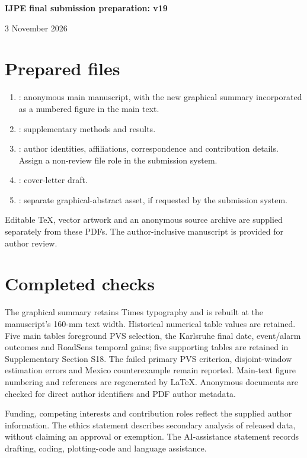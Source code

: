 \documentclass[11pt]{article}
\begin{document}
{\Large\bfseries IJPE final submission preparation: v19}\par
3 November 2026

\section*{Prepared files}
\begin{enumerate}
\item {}: anonymous main manuscript, with the new graphical summary incorporated as a numbered figure in the main text.
\item {}: supplementary methods and results.
\item {}: author identities, affiliations, correspondence and contribution details. Assign a non-review file role in the submission system.
\item {}: cover-letter draft.
\item {}: separate graphical-abstract asset, if requested by the submission system.
\end{enumerate}
Editable TeX, vector artwork and an anonymous source archive are supplied separately from these PDFs. The author-inclusive manuscript is provided for author review.

\section*{Completed checks}
The graphical summary retains Times typography and is rebuilt at the manuscript's 160-mm text width. Historical numerical table values are retained. Five main tables foreground PVS selection, the Karlsruhe final date, event/alarm outcomes and RoadSens temporal gains; five supporting tables are retained in Supplementary Section S18. The failed primary PVS criterion, disjoint-window estimation errors and Mexico counterexample remain reported. Main-text figure numbering and references are regenerated by LaTeX. Anonymous documents are checked for direct author identifiers and PDF author metadata.

Funding, competing interests and contribution roles reflect the supplied author information. The ethics statement describes secondary analysis of released data, without claiming an approval or exemption. The AI-assistance statement records drafting, coding, plotting-code and language assistance.
\end{document}
